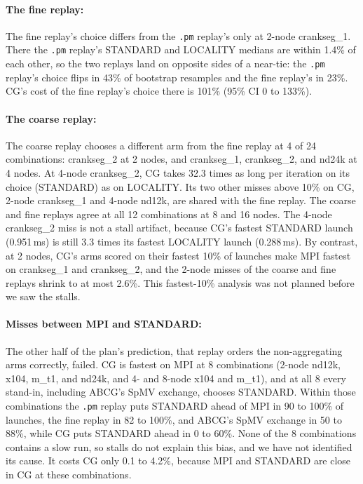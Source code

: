 \documentclass[11pt]{article}
\newcommand{\pmrep}{\texttt{.pm} replay}
\begin{document}
\paragraph{The fine replay:} The fine replay's choice differs from the \pmrep's only at
2-node crankseg\_1. There the \pmrep's STANDARD and LOCALITY medians are within 1.4\% of
each other, so the two replays land on opposite sides of a near-tie: the \pmrep's
choice flips in 43\% of bootstrap resamples and the fine replay's in 23\%. CG's cost of
the fine replay's choice there is 101\% (95\% CI 0 to 133\%).

\paragraph{The coarse replay:} The coarse replay chooses a different arm from the fine
replay at 4 of 24 combinations: crankseg\_2 at 2 nodes, and crankseg\_1, crankseg\_2,
and nd24k at 4 nodes. At 4-node crankseg\_2, CG takes 32.3 times as long per iteration
on its choice (STANDARD) as on LOCALITY. Its two other misses above 10\% on CG, 2-node
crankseg\_1 and 4-node nd12k, are shared with the fine replay. The coarse and fine
replays agree at all 12 combinations at 8 and 16 nodes. The 4-node crankseg\_2 miss is
not a stall artifact, because CG's fastest STANDARD launch (0.951\,ms) is still 3.3
times its fastest LOCALITY launch (0.288\,ms). By contrast, at 2 nodes, CG's arms scored
on their fastest 10\% of launches make MPI fastest on crankseg\_1 and crankseg\_2, and
the 2-node misses of the coarse and fine replays shrink to at most 2.6\%. This
fastest-10\% analysis was not planned before we saw the stalls.

\paragraph{Misses between MPI and STANDARD:} The other half of the plan's prediction,
that replay orders the non-aggregating arms correctly, failed. CG is fastest on MPI at 8
combinations (2-node nd12k, x104, m\_t1, and nd24k, and 4- and 8-node x104 and m\_t1),
and at all 8 every stand-in, including ABCG's SpMV exchange, chooses STANDARD. Within
those combinations the \pmrep{} puts STANDARD ahead of MPI in 90 to 100\% of launches,
the fine replay in 82 to 100\%, and ABCG's SpMV exchange in 50 to 88\%, while CG puts
STANDARD ahead in 0 to 60\%. None of the 8 combinations contains a slow run, so stalls
do not explain this bias, and we have not identified its cause. It costs CG only 0.1 to
4.2\%, because MPI and STANDARD are close in CG at these combinations.
\end{document}
